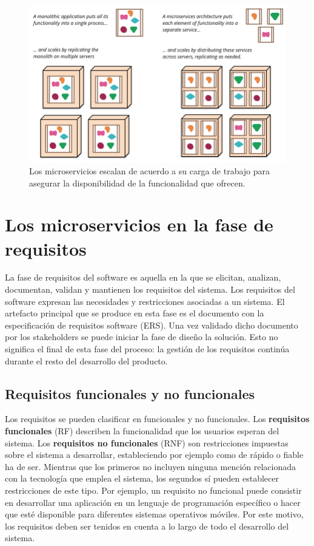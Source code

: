 \documentclass[11pt,spanish,listoffigures]{tfgetsinf}
\begin{document}
\begin{figure}[h]
\centering
\includegraphics[scale=0.4]{microservices_escaling}
\caption{Los microservicios escalan de acuerdo a su carga de trabajo para asegurar la disponibilidad de la funcionalidad que ofrecen. \cite{Lewis2014}}
\end{figure}

\section{Los microservicios en la fase de requisitos}

La fase de requisitos del software es aquella en la que se elicitan, analizan, documentan, validan y mantienen los requisitos del sistema. Los requisitos del software expresan las necesidades y restricciones asociadas a un sistema. \cite{Fernandes2016} El artefacto principal que se produce en esta fase es el documento con la especificación de requisitos software (ERS). Una vez validado dicho documento por los stakeholders se puede iniciar la fase de diseño la solución. Esto no significa el final de esta fase del proceso: la gestión de los requisitos continúa durante el resto del desarrollo del producto.

\subsection{Requisitos funcionales y no funcionales} \label{subsect:RNF}

Los requisitos se pueden clasificar en funcionales y no funcionales. Los \textbf{requisitos funcionales} (RF) describen la funcionalidad que los usuarios esperan del sistema. Los \textbf{requisitos no funcionales} (RNF) son restricciones impuestas sobre el sistema a desarrollar, estableciendo por ejemplo como de rápido o fiable ha de ser. Mientras que los primeros no incluyen ninguna mención relacionada con la tecnología que emplea el sistema, los segundos sí pueden establecer restricciones de este tipo. Por ejemplo, un requisito no funcional puede consistir en desarrollar una aplicación en un lenguaje de programación específico o hacer que esté disponible para diferentes sistemas operativos móviles. Por este motivo, los requisitos deben ser tenidos en cuenta a lo largo de todo el desarrollo del sistema.
\end{document}
